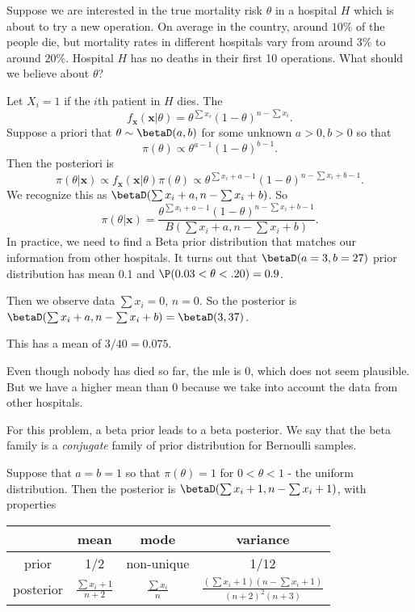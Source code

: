 \documentclass[a4paper]{article}
\begin{document}
\begin{eg}
  Suppose we are interested in the true mortality risk $\theta$ in a hospital $H$ which is about to try a new operation. On average in the country, around $10\%$ of the people die, but mortality rates in different hospitals vary from around $3\%$ to around $20\%$. Hospital $H$ has no deaths in their first 10 operations. What should we believe about $\theta$?

  Let $X_i = 1$ if the $i$th patient in $H$ dies. The
  \[
    f_{\mathbf{x}}(\mathbf{x}|\theta) = \theta^{\sum x_i}(1 - \theta)^{n - \sum x_i}.
  \]
  Suppose a priori that $\theta\sim \betaD(a, b)$ for some unknown $a > 0, b > 0$ so that
  \[
    \pi(\theta)\propto \theta^{a - 1}(1 - \theta)^{b - 1}.
  \]
  Then the posteriori is
  \[
    \pi(\theta|\mathbf{x})\propto f_{\mathbf{x}}(\mathbf{x}|\theta)\pi(\theta)\propto \theta^{\sum x_i + a - 1}(1 - \theta)^{n- \sum x_i + b - 1}.
  \]
  We recognize this as $\betaD(\sum x_i + a, n - \sum x_i + b)$. So
  \[
    \pi(\theta|\mathbf{x}) = \frac{\theta^{\sum x_i + a - 1}(1 - \theta)^{n - \sum x_i + b - 1}}{B(\sum x_i + a, n - \sum x_i + b)}.
  \]
  In practice, we need to find a Beta prior distribution that matches our information from other hospitals. It turns out that $\betaD(a = 3, b = 27)$ prior distribution has mean 0.1 and $\P(0.03 < \theta < .20) = 0.9$.

  Then we observe data $\sum x_i = 0$, $n = 0$. So the posterior is $\betaD(\sum x_i + a, n - \sum x_i + b) = \betaD(3, 37)$.

  This has a mean of $3/40 = 0.075$.

  Even though nobody has died so far, the mle is $0$, which does not seem plausible. But we have a higher mean than $0$ because we take into account the data from other hospitals.
\end{eg}

For this problem, a beta prior leads to a beta posterior. We say that the beta family is a \emph{conjugate} family of prior distribution for Bernoulli samples.

Suppose that $a = b = 1$ so that $\pi (\theta) = 1$ for $0 < \theta < 1$ - the uniform distribution. Then the posterior is $\betaD(\sum x_i + 1, n - \sum x_i + 1)$, with properties

\begin{tabular}[]{cccc}
  \toprule
  &mean & mode & variance\\
  \midrule
  prior & 1/2 & non-unique & 1/12\\
  posterior & $\displaystyle \frac{\sum x_i + 1}{n + 2}$ & $\displaystyle \frac{\sum x_i}{n}$ & $\displaystyle\frac{(\sum x_i + 1)(n - \sum x_i + 1)}{(n + 2)^2(n + 3)}$\\
  \bottomrule
\end{tabular}
\end{document}
